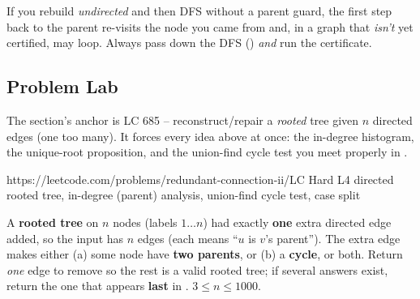 \begin{warningbox}
If you rebuild \emph{undirected}  and then DFS without a parent guard, the first step back
to the parent re-visits the node you came from and, in a graph that \emph{isn't} yet certified, may
loop. Always pass  down the DFS () \emph{and} run the certificate.
\end{warningbox}

\subsection{Problem Lab}

The section's anchor is LC 685 -- reconstruct/repair a \emph{rooted} tree given $n$ directed edges
(one too many). It forces every idea above at once: the in-degree histogram, the unique-root
proposition, and the union-find cycle test you meet properly in .

  {https://leetcode.com/problems/redundant-connection-ii/}{LC Hard L4}
  {directed rooted tree, in-degree (parent) analysis, union-find cycle test, case split}

\begin{problemstatement}
A \textbf{rooted tree} on $n$ nodes (labels $1\dots n$) had exactly \textbf{one} extra directed edge
added, so the input  has $n$ edges (each \code{[u,v]} means ``$u$ is $v$'s parent''). The
extra edge makes either (a) some node have \textbf{two parents}, or (b) a \textbf{cycle}, or both.
Return \emph{one} edge to remove so the rest is a valid rooted tree; if several answers exist,
return the one that appears \textbf{last} in . $3\le n\le 1000$.
\end{problemstatement}

